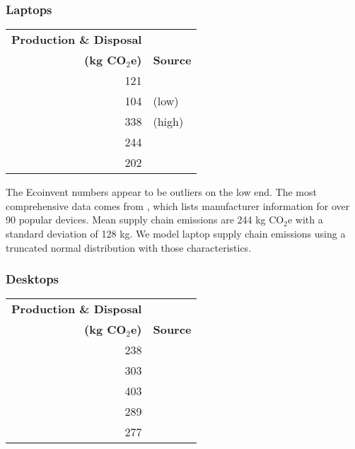 \documentclass[11pt]{article}
\newcommand{\assumption}[1]{{#1}}
\begin{document}
\subsubsection{Laptops}

\begin{center}
\begin{tabular}{|r|l|}
\hline
\textbf{Production \& Disposal} & \\
\textbf{(kg CO$_2$e)} & \textbf{Source} \\ \hline
121 & \textcite{ecoinvent}  \\ \hline
104 & \textcite{teehan2013} (low) \\ \hline
338 & \textcite{teehan2013} (high) \\ \hline
244 & \textcite{rarecoil} \\ \hline
202 & \textcite{unctadder2024} \\ \hline
\end{tabular}
\label{tab:embodied_emissions:laptops}
\end{center}

The Ecoinvent numbers appear to be outliers on the low end.
The most comprehensive data comes from \textcite{rarecoil}, which lists manufacturer
information for over 90 popular devices. Mean supply chain emissions are
244 kg CO$_2$e with a standard deviation of 128 kg.
\assumption{We model laptop supply chain emissions using a truncated normal distribution with those characteristics.}

\subsubsection{Desktops}

\begin{center}
\begin{tabular}{|r|l|}
\hline
\textbf{Production \& Disposal} & \\
\textbf{(kg CO$_2$e)} & \textbf{Source} \\ \hline
238 & \textcite{ecoinvent} \\ \hline
303 & \textcite{teehan2013} \\ \hline
403 & \textcite{unctadder2024} \\ \hline
289 & \textcite{dellpcf} \\ \hline
277 & \textcite{boavizta} \\ \hline
\end{tabular}
\label{tab:embodied_emissions:desktops}
\end{center}
\end{document}
